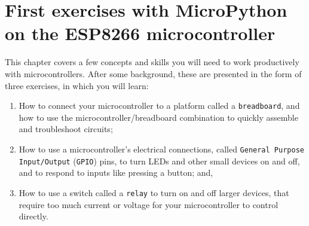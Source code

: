 \setchapterpreamble[u]{\margintoc}
\chapter{First exercises with MicroPython on the ESP8266 microcontroller}
This chapter covers a few concepts and skills you will need to work productively with microcontrollers. After some background, these are presented in the form of three exercises, in which you will learn: 
\begin{enumerate}
	\item How to connect your microcontroller to a platform called a \texttt{breadboard}, and how to use the microcontroller/breadboard combination to quickly assemble and troubleshoot circuits;
	\item How to use a microcontroller's electrical connections, called \texttt{General Purpose Input/Output} (\texttt{GPIO}) pins, to turn LEDs and other small devices on and off, and to respond to inputs like pressing a button; and,
	\item How to use a switch called a \texttt{relay} to turn on and off larger devices, that require too much current or voltage for your microcontroller to control directly.
\end{enumerate}

